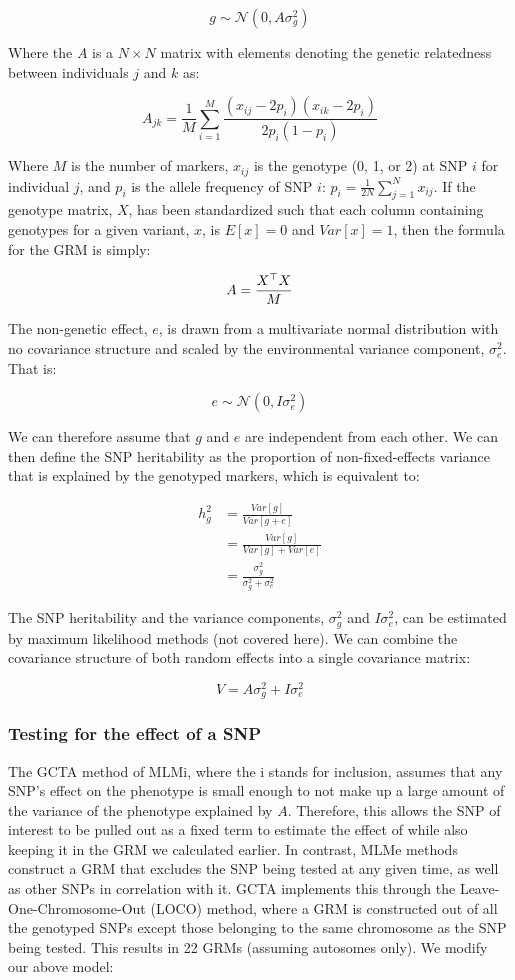 \documentclass[12pt]{article}
\begin{document}
$$ g \sim \mathcal{N} (0, A \sigma_g^2)$$

Where the $A$ is a $N \times N$ matrix with elements denoting the genetic relatedness between individuals $j$ and $k$ as:

$$ A_{jk} = \frac{1}{M} \sum_{i=1}^{M}
\frac{(x_{ij} - 2 p_i)(x_{ik} - 2 p_i)}
{2 p_i (1 - p_i)}
$$

Where $M$ is the number of markers, $x_{ij}$ is the genotype (0, 1, or 2) at SNP $i$ for individual $j$, and $p_i$ is the allele frequency of SNP $i$: $p_i = \frac{1}{2 N} \sum_{j=1}^{N} x_{ij}$.
If the genotype matrix, $X$, has been standardized such that each column containing genotypes for a given variant, $x$, is $E[x] = 0$ and $Var[x] = 1$, then the formula for the GRM is simply:

$$ A = \frac{ X^{\operatorname*{\top}} X }{M} $$

The non-genetic effect, $e$, is drawn from a multivariate normal distribution with no covariance structure and scaled by the environmental variance component, $\sigma_e^2$. That is:

$$ e \sim \mathcal{N} (0, I \sigma_e^2) $$

We can therefore assume that $g$ and $e$ are independent from each other.
We can then define the SNP heritability as the proportion of non-fixed-effects variance that is explained by the genotyped markers, which is equivalent to:

\begin{align*}
    h_g^2 &= \frac{Var[g]}{Var[g + e]} \\
    &= \frac{Var[g]}{Var[g] + Var[e]} \\
    &= \frac{\sigma_g^2}{\sigma_g^2 + \sigma_e^2}
\end{align*}

The SNP heritability and the variance components, $\sigma_g^2$ and $I \sigma_e^2$, can be estimated by maximum likelihood methods (not covered here).
We can combine the covariance structure of both random effects into a single covariance matrix:

$$ V = A \sigma_g^2 + I \sigma_e^2 $$

\subsubsection{Testing for the effect of a SNP}

The GCTA method of MLMi, where the i stands for inclusion, assumes that any SNP's effect on the phenotype is small enough to not make up a large amount of the variance of the phenotype explained by $A$.
Therefore, this allows the SNP of interest to be pulled out as a fixed term to estimate the effect of while also keeping it in the GRM we calculated earlier.
In contrast, MLMe methods construct a GRM that excludes the SNP being tested at any given time, as well as other SNPs in correlation with it.
GCTA implements this through the Leave-One-Chromosome-Out (LOCO) method, where a GRM is constructed out of all the genotyped SNPs except those belonging to the same chromosome as the SNP being tested.
This results in 22 GRMs (assuming autosomes only).
We modify our above model:
\end{document}
